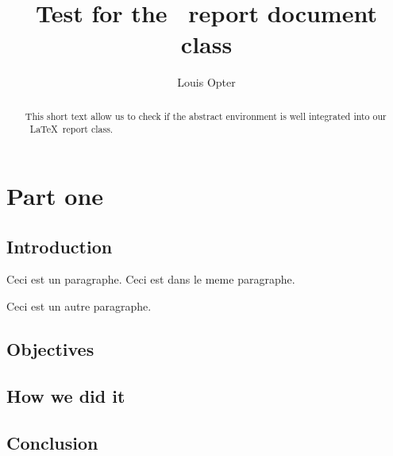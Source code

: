 \documentclass{rtxreport}
\author{Louis Opter}
\title{Test for the \rtx\ report document class}
\begin{document}
\maketitle

\begin{abstract}
This short text allow us to check if the abstract environment is well
integrated into our \rtx\ \LaTeX\ report class.
\end{abstract}

\rtxmaketitleblock

\tableofcontents

\chapter{Part one}

\section{Introduction}

\lipsum[1]

Ceci est un paragraphe.
Ceci est dans le meme paragraphe.

Ceci est un autre paragraphe.\nocite{AC97spec}

\section{Objectives}

\lipsum[2]

\section{How we did it}

\lipsum[3]

\section{Conclusion}

\lipsum[4]

\rtxbibliography
\end{document}
